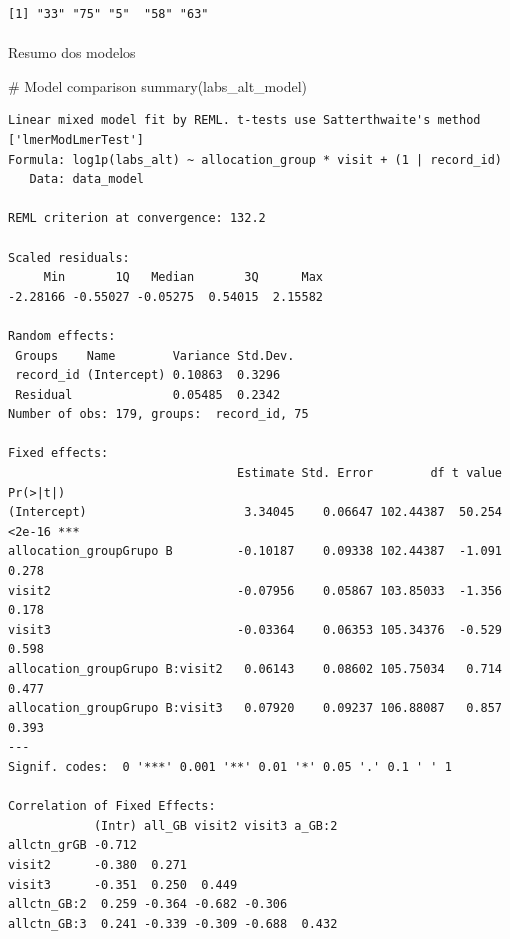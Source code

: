 \documentclass[
  12pt,
]{article}
\makeatletter
\let\oldparagraph\paragraph
\renewcommand{\paragraph}{
    \@ifstar
      \xxxParagraphStar
      \xxxParagraphNoStar
  }
\newcommand{\xxxParagraphStar}[1]{\oldparagraph*{#1}\mbox{}}
\newcommand{\xxxParagraphNoStar}[1]{\oldparagraph{#1}\mbox{}}
\newenvironment{Shaded}{\begin{snugshade}}{\end{snugshade}}
\newcommand{\CommentTok}[1]{\textcolor[rgb]{0.37,0.37,0.37}{#1}}
\newcommand{\FunctionTok}[1]{\textcolor[rgb]{0.28,0.35,0.67}{#1}}
\newcommand{\NormalTok}[1]{\textcolor[rgb]{0.00,0.23,0.31}{#1}}
\makeatother
\begin{document}
\begin{verbatim}
[1] "33" "75" "5"  "58" "63"
\end{verbatim}

\paragraph{Resumo dos modelos}\label{resumo-dos-modelos-1}

\begin{Shaded}
\begin{Highlighting}[]
\CommentTok{\# Model comparison}
\FunctionTok{summary}\NormalTok{(labs\_alt\_model)}
\end{Highlighting}
\end{Shaded}

\begin{verbatim}
Linear mixed model fit by REML. t-tests use Satterthwaite's method ['lmerModLmerTest']
Formula: log1p(labs_alt) ~ allocation_group * visit + (1 | record_id)
   Data: data_model

REML criterion at convergence: 132.2

Scaled residuals: 
     Min       1Q   Median       3Q      Max 
-2.28166 -0.55027 -0.05275  0.54015  2.15582 

Random effects:
 Groups    Name        Variance Std.Dev.
 record_id (Intercept) 0.10863  0.3296  
 Residual              0.05485  0.2342  
Number of obs: 179, groups:  record_id, 75

Fixed effects:
                                Estimate Std. Error        df t value Pr(>|t|)    
(Intercept)                      3.34045    0.06647 102.44387  50.254   <2e-16 ***
allocation_groupGrupo B         -0.10187    0.09338 102.44387  -1.091    0.278    
visit2                          -0.07956    0.05867 103.85033  -1.356    0.178    
visit3                          -0.03364    0.06353 105.34376  -0.529    0.598    
allocation_groupGrupo B:visit2   0.06143    0.08602 105.75034   0.714    0.477    
allocation_groupGrupo B:visit3   0.07920    0.09237 106.88087   0.857    0.393    
---
Signif. codes:  0 '***' 0.001 '**' 0.01 '*' 0.05 '.' 0.1 ' ' 1

Correlation of Fixed Effects:
            (Intr) all_GB visit2 visit3 a_GB:2
allctn_grGB -0.712                            
visit2      -0.380  0.271                     
visit3      -0.351  0.250  0.449              
allctn_GB:2  0.259 -0.364 -0.682 -0.306       
allctn_GB:3  0.241 -0.339 -0.309 -0.688  0.432
\end{verbatim}
\end{document}
